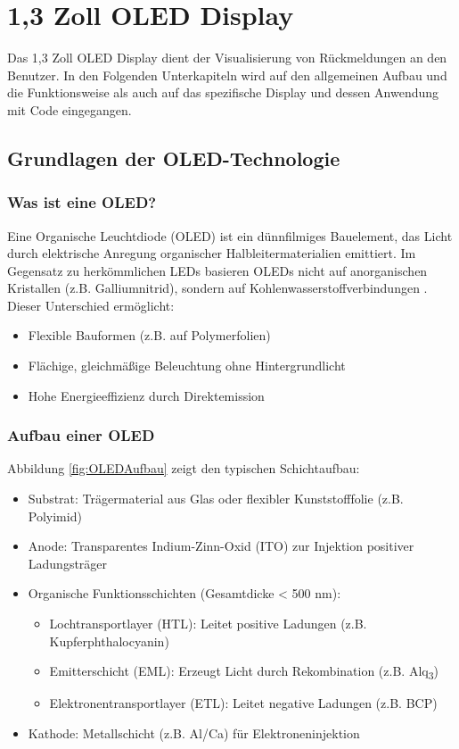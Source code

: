 \chapter{1,3 Zoll OLED Display}
\label{ch:Display}

Das 1,3 Zoll OLED Display dient der Visualisierung von Rückmeldungen an den Benutzer. In den Folgenden Unterkapiteln wird auf den allgemeinen Aufbau und die Funktionsweise als auch auf das spezifische Display und dessen Anwendung mit Code eingegangen.

\section{Grundlagen der OLED-Technologie}

\subsection{Was ist eine OLED?}
Eine Organische Leuchtdiode (OLED) ist ein dünnfilmiges Bauelement, das Licht durch elektrische Anregung organischer Halbleitermaterialien emittiert. Im Gegensatz zu herkömmlichen LEDs basieren OLEDs nicht auf anorganischen Kristallen (z.B. Galliumnitrid), sondern auf Kohlenwasserstoffverbindungen \cite{Bartlett:2023} . Dieser Unterschied ermöglicht: 

\begin{itemize}
    \item Flexible Bauformen (z.B. auf Polymerfolien)
    \item Flächige, gleichmäßige Beleuchtung ohne Hintergrundlicht
    \item Hohe Energieeffizienz durch Direktemission
\end{itemize}
\cite{Bartlett:2023} \cite{Stotz:2019} \cite{Wellmann:2017} 

\subsection{Aufbau einer OLED}
Abbildung \ref{fig:OLEDAufbau} zeigt den typischen Schichtaufbau:
\begin{itemize}
    \item Substrat: Trägermaterial aus Glas oder flexibler Kunststofffolie (z.B. Polyimid)
    \item Anode: Transparentes Indium-Zinn-Oxid (ITO) zur Injektion positiver Ladungsträger
    \item Organische Funktionsschichten (Gesamtdicke < 500 nm):
    \begin{itemize}
        \item Lochtransportlayer (HTL): Leitet positive Ladungen (z.B. Kupferphthalocyanin)
        \item Emitterschicht (EML): Erzeugt Licht durch Rekombination (z.B. Alq\textsubscript{3})
        \item Elektronentransportlayer (ETL): Leitet negative Ladungen (z.B. BCP)
    \end{itemize}
    \item Kathode: Metallschicht (z.B. Al/Ca) für Elektroneninjektion
\end{itemize}
\cite{Bartlett:2023} \cite{Stotz:2019} \cite{Wellmann:2017}

